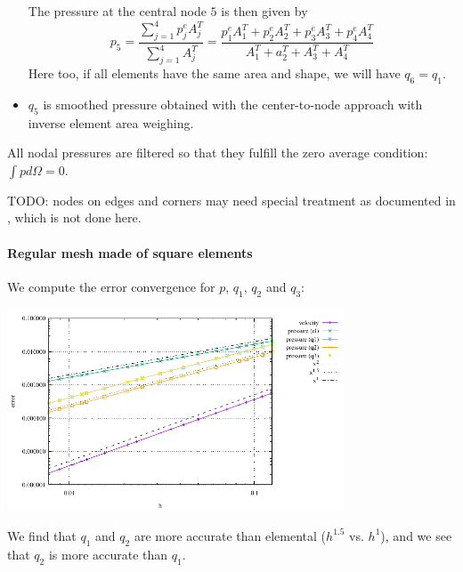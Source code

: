 \begin{itemize}
The pressure at the central node $5$ is then given by 
\[
p_5 = \frac{\sum\limits_{j=1}^4 p_j^e A_j^T}{\sum\limits_{j=1}^4 A_j^T}
=
\frac{  p_1^e A_1^T+p_2^e A_2^T+p_3^e A_3^T+p_4^e A_4^T
}{ A_1^T + a_2^T + A_3^T + A_4^T}
\]
Here too, if all elements have the same area and shape, we will have $q_6=q_1$.

\item $q_5$ is smoothed pressure obtained with the  center-to-node approach with inverse element area weighing.
\end{itemize}

All nodal pressures are filtered so that they fulfill the zero average condition: $\int p d\Omega = 0$.

TODO: nodes on edges and corners may need special treatment as documented in \cite{sagl81a}, 
which is not done here. 

\newpage
\paragraph{Regular mesh made of square elements}

We compute the error convergence for $p$, $q_1$, $q_2$ and $q_3$:
\begin{center}
\includegraphics[width=10cm]{python_codes/fieldstone_12/results/reg/errors}
\end{center}
We find that $q_1$ and $q_2$ are more accurate than elemental ($h^{1.5}$ vs. $h^1$), and we see that 
$q_2$ is more accurate than $q_1$.


